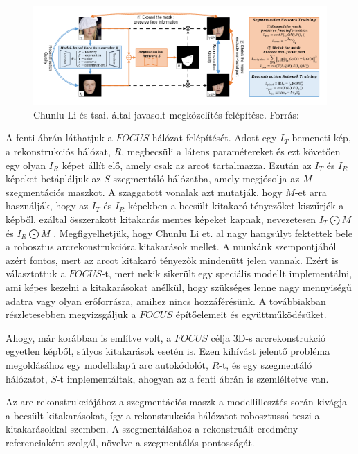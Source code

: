 \documentclass[12pt,a4]{article}
\begin{document}
 	\begin{figure}[h]	
 		\centering
 		\includegraphics[width=1\linewidth]{focus}
 		\caption{Chunlu Li és tsai. által javasolt megközelítés felépítése.
 			Forrás:\cite{focus}}
        \label{fig:focus}
 	\end{figure}
 	
 	A fenti ábrán láthatjuk a $FOCUS$ hálózat felépítését.
 	Adott egy $I_{T}$ bemeneti kép, a rekonstrukciós hálózat, $R$, megbecsüli a látens
 	paramétereket és ezt követően egy olyan $I_{R}$ képet állít elő, amely csak az
 	arcot tartalmazza. Ezután az $I_{T}$ és $I_{R}$ képeket betápláljuk az $S$ szegmentáló
 	hálózatba, amely megjósolja az $M$ szegmentációs maszkot. A szaggatott
 	vonalak azt mutatják, hogy $M$-et arra használják, hogy az $I_{T}$ és $I_{R}$ képekben
 	a becsült kitakaró tényezőket kiszűrjék a képből, ezáltal összerakott kitakarás mentes képeket
 	kapnak, nevezetesen $I_{T}\bigodot M$ és $I_{R}\bigodot M$ .
 	Megfigyelhetjük, hogy Chunlu Li et. al nagy hangsúlyt fektettek bele a
 	robosztus arcrekonstrukcióra kitakarások mellet. A munkánk szempontjából
 	azért fontos, mert az arcot kitakaró tényezők mindenütt jelen vannak. Ezért is választottuk
 	a $FOCUS$-t, mert nekik sikerült egy speciális modellt implementálni, ami
 	képes kezelni a kitakarásokat anélkül, hogy szükséges lenne nagy mennyiségű
 	adatra vagy olyan erőforrásra, amihez nincs hozzáférésünk.
 	A továbbiakban részletesebben megvizsgáljuk a $FOCUS$ építőelemeit és
 	együttműködésüket.
 	
 	Ahogy, már korábban is említve volt, a $FOCUS$ célja 3D-s
 	arcrekonstrukció egyetlen képből, súlyos kitakarások esetén is. Ezen kihívást
 	jelentő probléma megoldásához egy modellalapú arc autokódolót, $R$-t, és
 	egy szegmentáló hálózatot, $S$-t implementáltak, ahogyan az a fenti ábrán is
 	szemléltetve van.
 	
 	Az arc rekonstrukciójához a szegmentációs maszk a modellillesztés során
 	kivágja a becsült kitakarásokat, így a rekonstrukciós hálózatot robosztussá
 	teszi a kitakarásokkal szemben. A szegmentáláshoz a rekonstruált eredmény
 	referenciaként szolgál, növelve a szegmentálás pontosságát.
 	
\end{document}
